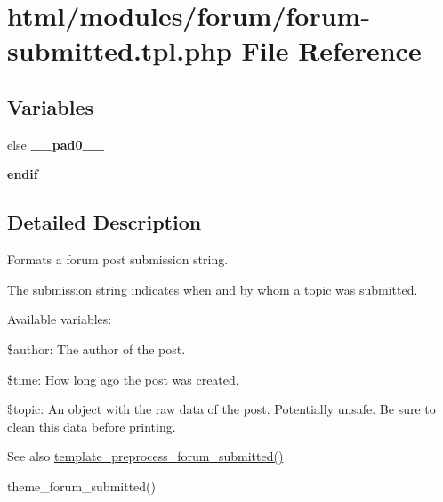 \hypertarget{forum-submitted_8tpl_8php}{
\section{html/modules/forum/forum-\/submitted.tpl.php File Reference}
\label{forum-submitted_8tpl_8php}
}
\subsection*{Variables}
\begin{DoxyCompactItemize}
\item 
\hypertarget{forum-submitted_8tpl_8php_a8e01dcc96c43199448ee66f7c2ae8ea6}{
else {\bfseries \_\-\_\-pad0\_\-\_\-}}
\label{forum-submitted_8tpl_8php_a8e01dcc96c43199448ee66f7c2ae8ea6}

\item 
\hypertarget{forum-submitted_8tpl_8php_a82cd33ca97ff99f2fcc5e9c81d65251b}{
{\bfseries endif}}
\label{forum-submitted_8tpl_8php_a82cd33ca97ff99f2fcc5e9c81d65251b}

\end{DoxyCompactItemize}


\subsection{Detailed Description}
Formats a forum post submission string.

The submission string indicates when and by whom a topic was submitted.

Available variables:
\begin{DoxyItemize}
\item \$author: The author of the post.
\item \$time: How long ago the post was created.
\item \$topic: An object with the raw data of the post. Potentially unsafe. Be sure to clean this data before printing.
\end{DoxyItemize}

\begin{DoxySeeAlso}{See also}
\hyperlink{forum_8module_abb16229c10878e4cf5723284d194ca9c}{template\_\-preprocess\_\-forum\_\-submitted()} 

theme\_\-forum\_\-submitted() 
\end{DoxySeeAlso}
